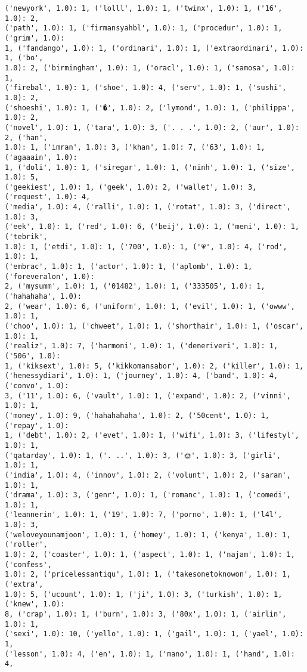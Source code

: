 \documentclass[11pt]{article}
\begin{document}
\begin{Verbatim}[commandchars=\\\{\}]
('newyork', 1.0): 1, ('lolll', 1.0): 1, ('twinx', 1.0): 1, ('16', 1.0): 2,
('path', 1.0): 1, ('firmansyahbl', 1.0): 1, ('procedur', 1.0): 1, ('grim', 1.0):
1, ('fandango', 1.0): 1, ('ordinari', 1.0): 1, ('extraordinari', 1.0): 1, ('bo',
1.0): 2, ('birmingham', 1.0): 1, ('oracl', 1.0): 1, ('samosa', 1.0): 1,
('firebal', 1.0): 1, ('shoe', 1.0): 4, ('serv', 1.0): 1, ('sushi', 1.0): 2,
('shoeshi', 1.0): 1, ('�', 1.0): 2, ('lymond', 1.0): 1, ('philippa', 1.0): 2,
('novel', 1.0): 1, ('tara', 1.0): 3, ('. . .', 1.0): 2, ('aur', 1.0): 2, ('han',
1.0): 1, ('imran', 1.0): 3, ('khan', 1.0): 7, ('63', 1.0): 1, ('agaaain', 1.0):
1, ('doli', 1.0): 1, ('siregar', 1.0): 1, ('ninh', 1.0): 1, ('size', 1.0): 5,
('geekiest', 1.0): 1, ('geek', 1.0): 2, ('wallet', 1.0): 3, ('request', 1.0): 4,
('media', 1.0): 4, ('ralli', 1.0): 1, ('rotat', 1.0): 3, ('direct', 1.0): 3,
('eek', 1.0): 1, ('red', 1.0): 6, ('beij', 1.0): 1, ('meni', 1.0): 1, ('tebrik',
1.0): 1, ('etdi', 1.0): 1, ('700', 1.0): 1, ('💗', 1.0): 4, ('rod', 1.0): 1,
('embrac', 1.0): 1, ('actor', 1.0): 1, ('aplomb', 1.0): 1, ('foreveralon', 1.0):
2, ('mysumm', 1.0): 1, ('01482', 1.0): 1, ('333505', 1.0): 1, ('hahahaha', 1.0):
2, ('wear', 1.0): 6, ('uniform', 1.0): 1, ('evil', 1.0): 1, ('owww', 1.0): 1,
('choo', 1.0): 1, ('chweet', 1.0): 1, ('shorthair', 1.0): 1, ('oscar', 1.0): 1,
('realiz', 1.0): 7, ('harmoni', 1.0): 1, ('deneriveri', 1.0): 1, ('506', 1.0):
1, ('kiksext', 1.0): 5, ('kikkomansabor', 1.0): 2, ('killer', 1.0): 1,
('henessydiari', 1.0): 1, ('journey', 1.0): 4, ('band', 1.0): 4, ('convo', 1.0):
3, ('11', 1.0): 6, ('vault', 1.0): 1, ('expand', 1.0): 2, ('vinni', 1.0): 1,
('money', 1.0): 9, ('hahahahaha', 1.0): 2, ('50cent', 1.0): 1, ('repay', 1.0):
1, ('debt', 1.0): 2, ('evet', 1.0): 1, ('wifi', 1.0): 3, ('lifestyl', 1.0): 1,
('qatarday', 1.0): 1, ('. ..', 1.0): 3, ('🌞', 1.0): 3, ('girli', 1.0): 1,
('india', 1.0): 4, ('innov', 1.0): 2, ('volunt', 1.0): 2, ('saran', 1.0): 1,
('drama', 1.0): 3, ('genr', 1.0): 1, ('romanc', 1.0): 1, ('comedi', 1.0): 1,
('leannerin', 1.0): 1, ('19', 1.0): 7, ('porno', 1.0): 1, ('l4l', 1.0): 3,
('weloveyounamjoon', 1.0): 1, ('homey', 1.0): 1, ('kenya', 1.0): 1, ('roller',
1.0): 2, ('coaster', 1.0): 1, ('aspect', 1.0): 1, ('najam', 1.0): 1, ('confess',
1.0): 2, ('pricelessantiqu', 1.0): 1, ('takesonetoknowon', 1.0): 1, ('extra',
1.0): 5, ('ucount', 1.0): 1, ('ji', 1.0): 3, ('turkish', 1.0): 1, ('knew', 1.0):
8, ('crap', 1.0): 1, ('burn', 1.0): 3, ('80x', 1.0): 1, ('airlin', 1.0): 1,
('sexi', 1.0): 10, ('yello', 1.0): 1, ('gail', 1.0): 1, ('yael', 1.0): 1,
('lesson', 1.0): 4, ('en', 1.0): 1, ('mano', 1.0): 1, ('hand', 1.0): 4,

\end{Verbatim}
\end{document}
